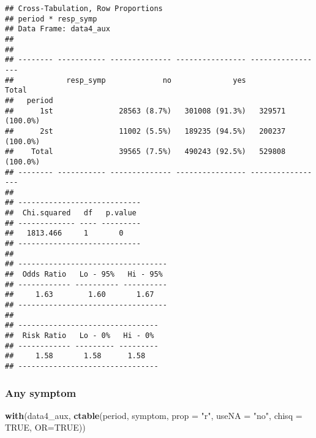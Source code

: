\documentclass[
]{article}
\newenvironment{Shaded}{\begin{snugshade}}{\end{snugshade}}
\newcommand{\DataTypeTok}[1]{\textcolor[rgb]{0.13,0.29,0.53}{#1}}
\newcommand{\KeywordTok}[1]{\textcolor[rgb]{0.13,0.29,0.53}{\textbf{#1}}}
\newcommand{\NormalTok}[1]{#1}
\newcommand{\OtherTok}[1]{\textcolor[rgb]{0.56,0.35,0.01}{#1}}
\newcommand{\StringTok}[1]{\textcolor[rgb]{0.31,0.60,0.02}{#1}}
\begin{document}
\begin{verbatim}
## Cross-Tabulation, Row Proportions  
## period * resp_symp  
## Data Frame: data4_aux  
## 
## 
## -------- ----------- -------------- ---------------- -----------------
##            resp_symp             no              yes             Total
##   period                                                              
##      1st               28563 (8.7%)   301008 (91.3%)   329571 (100.0%)
##      2st               11002 (5.5%)   189235 (94.5%)   200237 (100.0%)
##    Total               39565 (7.5%)   490243 (92.5%)   529808 (100.0%)
## -------- ----------- -------------- ---------------- -----------------
## 
## ----------------------------
##  Chi.squared   df   p.value 
## ------------- ---- ---------
##   1813.466     1       0    
## ----------------------------
## 
## ----------------------------------
##  Odds Ratio   Lo - 95%   Hi - 95% 
## ------------ ---------- ----------
##     1.63        1.60       1.67   
## ----------------------------------
## 
## --------------------------------
##  Risk Ratio   Lo - 0%   Hi - 0% 
## ------------ --------- ---------
##     1.58       1.58      1.58   
## --------------------------------
\end{verbatim}

\hypertarget{any-symptom-1}{%
\subsubsection{Any symptom}\label{any-symptom-1}}

\begin{Shaded}
\begin{Highlighting}[]
\KeywordTok{with}\NormalTok{(data4_aux, }\KeywordTok{ctable}\NormalTok{(period, symptom, }\DataTypeTok{prop =} \StringTok{"r"}\NormalTok{, }\DataTypeTok{useNA =} \StringTok{"no"}\NormalTok{, }\DataTypeTok{chisq =} \OtherTok{TRUE}\NormalTok{, }\DataTypeTok{OR=}\OtherTok{TRUE}\NormalTok{))}
\end{Highlighting}
\end{Shaded}
\end{document}
